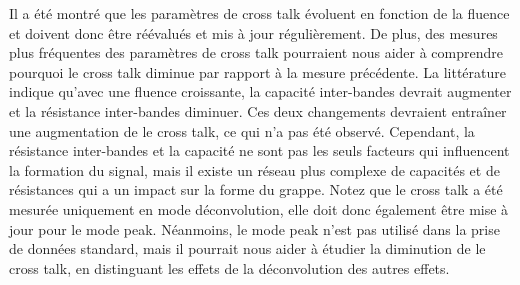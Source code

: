 
Il a été montré que les paramètres de cross talk évoluent en fonction de la fluence et doivent donc être réévalués et mis à jour régulièrement. De plus, des mesures plus fréquentes des paramètres de cross talk pourraient nous aider à comprendre pourquoi le cross talk diminue par rapport à la mesure précédente. La littérature indique qu'avec une fluence croissante, la capacité inter-bandes devrait augmenter et la résistance inter-bandes diminuer. Ces deux changements devraient entraîner une augmentation de le cross talk, ce qui n’a pas été observé. Cependant, la résistance inter-bandes et la capacité ne sont pas les seuls facteurs qui influencent la formation du signal, mais il existe un réseau plus complexe de capacités et de résistances qui a un impact sur la forme du grappe. Notez que le cross talk a été mesurée uniquement en mode déconvolution, elle doit donc également être mise à jour pour le mode peak. Néanmoins, le mode peak n'est pas utilisé dans la prise de données standard, mais il pourrait nous aider à étudier la diminution de le cross talk, en distinguant les effets de la déconvolution des autres effets.

